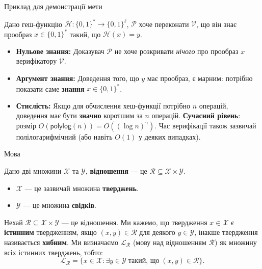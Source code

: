 \documentclass{../zkdl-presentation-template}
\begin{document}
    \begin{frame}{Приклад для демонстрації мети}
        \begin{example}
            Дано геш-функцію $\mathcal{H}: \{0,1\}^* \to \{0,1\}^{\ell}$, $\mathcal{P}$ хоче переконати $\mathcal{V}$, що він знає прообраз $x \in \{0,1\}^*$ такий, що $\mathcal{H}(x) = y$.
            \begin{itemize}
                \item \textbf{Нульове знання:} Доказувач $\mathcal{P}$ не хоче розкривати \textit{нічого} про прообраз $x$ верифікатору $\mathcal{V}$.
                \item \textbf{Аргумент знання:} Доведення того, що $y$ має прообраз, є марним: потрібно показати саме \textbf{знання} $x \in \{0,1\}^*$.
                \item \textbf{Стислість:} Якщо для обчислення хеш-функції потрібно $n$ операцій, доведення має бути \textbf{значно} коротшим за $n$ операцій. \textbf{Сучасний рівень}: розмір $O(\mathsf{polylog}(n)) = O((\log n)^{\gamma})$. Час верифікації також зазвичай полілогарифмічний (або навіть $O(1)$ у деяких випадках).
            \end{itemize}
        \end{example}
    \end{frame}
        
        \begin{frame}{Мова}
        \begin{definition}[Відношення]
            Дано дві множини $\mathcal{X}$ та $\mathcal{Y}$, \textbf{відношення} — це $\mathcal{R} \subseteq \mathcal{X} \times \mathcal{Y}$.
            \begin{itemize}
                \item $\mathcal{X}$ — це зазвичай множина \textbf{тверджень}.
                \item $\mathcal{Y}$ — це множина \textbf{свідків}.
            \end{itemize}
        \end{definition}

        \begin{definition}
            Нехай $\mathcal{R} \subseteq \mathcal{X} \times \mathcal{Y}$ — це відношення. Ми кажемо, що твердження $x \in \mathcal{X}$ є \textbf{істинним} твердженням, якщо $(x,y) \in \mathcal{R}$ для деякого $y \in \mathcal{Y}$, інакше твердження називається \textbf{хибним}. Ми визначаємо $\mathcal{L}_{\mathcal{R}}$ (мову над відношенням $\mathcal{R}$) як множину всіх істинних тверджень, тобто:
            \begin{equation*}
                \mathcal{L}_{\mathcal{R}} = \{ x \in \mathcal{X}: \exists y \in \mathcal{Y} \; \text{такий, що} \; (x,y) \in \mathcal{R} \}.
            \end{equation*}
        \end{definition}
    \end{frame}
\end{document}

